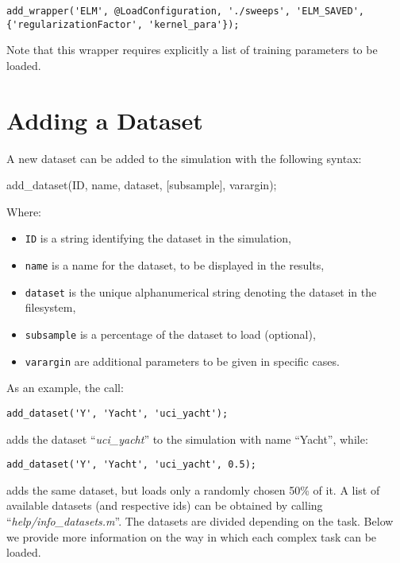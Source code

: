 \begin{lstlisting}
add_wrapper('ELM', @LoadConfiguration, './sweeps', 'ELM_SAVED', {'regularizationFactor', 'kernel_para'});
\end{lstlisting}

\noindent Note that this wrapper requires explicitly a list of training parameters to be loaded.

\section{Adding a Dataset}

A new dataset can be added to the simulation with the following syntax:

\begin{console}
add_dataset(ID, name, dataset, [subsample], varargin);
\end{console}

Where:

\begin{itemize}
\item \verb|ID| is a string identifying the dataset in the simulation,
\item \verb|name| is a name for the dataset, to be displayed in the results,
\item \verb|dataset| is the unique alphanumerical string denoting the dataset in the filesystem,
\item \verb|subsample| is a percentage of the dataset to load (optional),
\item \verb|varargin| are additional parameters to be given in specific cases.
\end{itemize}

\noindent As an example, the call:

\begin{lstlisting}
add_dataset('Y', 'Yacht', 'uci_yacht');
\end{lstlisting}

\noindent adds the dataset ``\textit{uci\_yacht}'' to the simulation with name ``Yacht'', while:

\begin{lstlisting}
add_dataset('Y', 'Yacht', 'uci_yacht', 0.5);
\end{lstlisting}

\noindent adds the same dataset, but loads only a randomly chosen 50\% of it. A list of available datasets (and respective ids) can be obtained by calling ``\textit{help/info\_datasets.m}''. The datasets are divided depending on the task. Below we provide more information on the way in which each complex task can be loaded.

